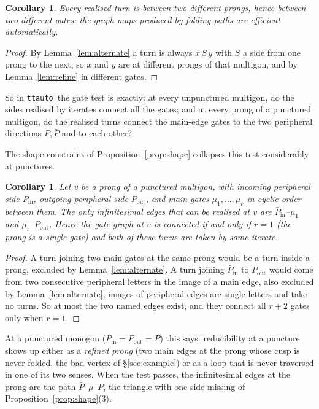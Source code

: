 \documentclass[12pt]{amsart}
\newcommand{\anti}[1]{\bar{#1}}          %
\newcommand{\per}{P}                      %
\newcommand{\ttauto}{\texttt{ttauto}}
\theoremstyle{plain}
\newtheorem{Corollary}[Theorem]{Corollary}
\theoremstyle{definition}
\begin{document}
\begin{Corollary}
  \label{cor:efficient}
  Every realised turn is between two different prongs, hence between two
  different gates: the graph maps produced by folding paths are efficient
  automatically.
\end{Corollary}
\begin{proof}
  By Lemma~\ref{lem:alternate} a turn is always $x\,S\,y$ with $S$ a side
  from one prong to the next; so $\anti x$ and $y$ are at different prongs
  of that multigon, and by Lemma~\ref{lem:refine} in different gates.
\end{proof}

So in \ttauto\ the gate test is exactly: at every unpunctured multigon, do
the sides realised by iterates connect all the gates; and at every prong of
a punctured multigon, do the realised turns connect the main-edge gates to
the two peripheral directions $\per,\anti\per$ and to each other?

The shape constraint of Proposition~\ref{prop:shape} collapses this test
considerably at punctures.

\begin{Corollary}
  \label{cor:puncture}
  Let $v$ be a prong of a punctured multigon, with incoming peripheral side
  $\per_{\mathrm{in}}$, outgoing peripheral side $\per_{\mathrm{out}}$,
  and main gates $\mu_1,\dots,\mu_r$ in cyclic order between them.  The
  only infinitesimal edges that can be realised at $v$ are
  $\anti\per_{\mathrm{in}}$--$\mu_1$ and $\mu_r$--$\per_{\mathrm{out}}$.
  Hence the gate graph at $v$ is connected if and only if $r=1$ (the prong
  is a single gate) and both of these turns are taken by some iterate.
\end{Corollary}
\begin{proof}
  A turn joining two main gates at the same prong would be a turn inside
  a prong, excluded by Lemma~\ref{lem:alternate}.  A turn joining
  $\anti\per_{\mathrm{in}}$ to $\per_{\mathrm{out}}$ would come from two
  consecutive peripheral letters in the image of a main edge, also excluded
  by Lemma~\ref{lem:alternate}; images of peripheral edges are single
  letters and take no turns.  So at most the two named edges exist, and
  they connect all $r+2$ gates only when $r=1$.
\end{proof}

At a punctured monogon ($\per_{\mathrm{in}}=\per_{\mathrm{out}}=\per$)
this says: reducibility at a puncture shows up either as a \emph{refined
prong} (two main edges at the prong whose cusp is never folded, the bad
vertex of \S\ref{sec:example}) or as a loop that is never traversed in
one of its two senses.  When the test passes, the infinitesimal edges at
the prong are the path $\anti\per$--$\mu$--$\per$, the triangle with one
side missing of Proposition~\ref{prop:shape}(3).
\end{document}
